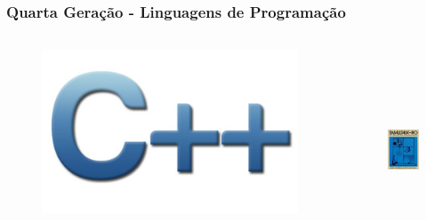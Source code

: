 \documentclass[aspectratio=169,
				xcolor=table]{beamer}
\begin{document}
	\begin{frame}
		\frametitle{Quarta Geração - Linguagens de Programação}
		\begin{columns}
			\begin{column}{0.5\textwidth}
				\begin{figure}
					\centering
					\includegraphics[width=\textwidth, keepaspectratio]{../figs/cap03/linguagemcpp} 			
				\end{figure}
			\end{column}
			\begin{column}{0.5\textwidth}
				\vspace{-1em}
				\begin{figure}
					\centering
					\includegraphics[height=6cm, keepaspectratio]{../figs/cap03/linguagemsmalltalk} 			
				\end{figure}
			\end{column}
		\end{columns}
	\end{frame}
	
\end{document}
